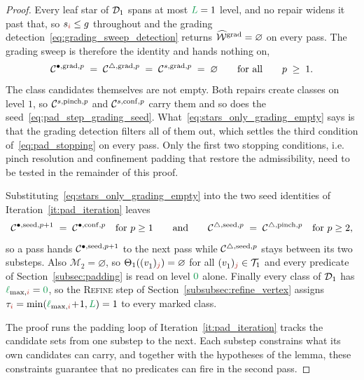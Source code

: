 \documentclass[a4paper, 12pt]{article}
\makeatletter
\DeclareRobustCommand{\candV}[1][]{\mathcal{C}^{\bullet\ifx\@empty#1\@empty\else,#1\fi}}
\DeclareRobustCommand{\candF}[1][]{\mathcal{C}^{\triangle\ifx\@empty#1\@empty\else,#1\fi}}
\DeclareRobustCommand{\candC}[1][]{\mathcal{C}^{s\ifx\@empty#1\@empty\else,#1\fi}}
\newcommand{\lmaxIdx}[1]{\l_{\max,#1}}
\newcommand{\levelSpan}[1]{s_{#1}}
\newcommand{\targetlevel}{\tau}                                 %
\newcommand{\green}{\color{ForestGreen}}
\newcommand{\brickred}{\color{BrickRed}}
\newcommand{\T}{\mathcal{T}}
\newcommand{\vertex}[2]{\freeQ{v}{}{#1}{#2}}
\DeclareRobustCommand{\markedVertexClasses}[1][]{\widehat{\mathcal{W}}\ifx\@empty#1\@empty\else^{#1}\fi}
\newcommand{\coarseIdxone}{{\brickred i}}
\newcommand{\fineIdxone}{{\brickred j}}
\renewcommand{\l}{{\green\ell}}
\renewcommand{\L}{{\green L}}
\newcommand{\lzero}{{\green 0}}
\newcommand{\freeQ}[4]{ ( {#1}^{#2}_{#3} )_{#4}}
\newcommand{\M}{\mathcal{M}}
\theoremstyle{definition}
\theoremstyle{plain}
\numberwithin{equation}{section}
\DeclareRobustCommand{\domseq}[1][]{\mathcal{D}\ifx\@empty#1\@empty\else_{#1}\fi}
\newcommand{\refFan}[1]{\Theta_{#1}}                        %
\makeatother
\begin{document}
\begin{proof}
    Every leaf star of $\domseq[1]$ spans at most $\L = 1$ level, and no repair widens it past that, so $\levelSpan{\coarseIdxone} \leq g$ throughout and the grading detection~\eqref{eq:grading_sweep_detection} returns $\markedVertexClasses[\mathrm{grad}] = \varnothing$ on every pass. The grading sweep is therefore the identity and hands nothing on,
    \begin{equation}
        \label{eq:stars_only_grading_empty}
        \candV[\mathrm{grad},p] \; = \; \candF[\mathrm{grad},p] \; = \; \candC[\mathrm{grad},p] \; = \; \varnothing
        \qquad \text{for all} \qquad p \; \geq \; 1 .
    \end{equation}
    The class candidates themselves are not empty. Both repairs create classes on level $1$, so $\candC[\mathrm{pinch},p]$ and $\candC[\mathrm{conf},p]$ carry them and so does the seed~\eqref{eq:pad_step_grading_seed}. What~\eqref{eq:stars_only_grading_empty} says is that the grading detection filters all of them out, which settles the third condition of~\eqref{eq:pad_stopping} on every pass. Only the first two stopping conditions, i.e. pinch resolution and confinement padding that restore the admissibility, need to be tested in the remainder of this proof. 
    
    Substituting~\eqref{eq:stars_only_grading_empty} into the two seed identities of Iteration~\ref{it:pad_iteration} leaves
    \begin{equation}
        \label{eq:stars_only_seed_identities}
        \candV[\mathrm{seed},p+1] \; = \; \candV[\mathrm{conf},p] \quad \text{for } p \geq 1
        \qquad \text{and} \qquad
        \candF[\mathrm{seed},p] \; = \; \candF[\mathrm{pinch},p] \quad \text{for } p \geq 2 ,
    \end{equation}
    so a pass hands $\candV[\mathrm{seed},p+1]$ to the next pass while $\candF[\mathrm{seed},p]$ stays between its two substeps. Also $\M_2 = \varnothing$, so $\refFan{1}(\vertex{1}{\fineIdxone}) = \varnothing$ for all $\vertex{1}{\fineIdxone} \in \T_1$ and every predicate of Section~\ref{subsec:padding} is read on level $\lzero$ alone. Finally every class of $\domseq[1]$ has $\lmaxIdx{\coarseIdxone} = \lzero$, so the \textsc{Refine} step of Section~\ref{subsubsec:refine_vertex} assigns $\targetlevel_\coarseIdxone = \min(\lmaxIdx{\coarseIdxone} \! + \! 1, \L) = 1$ to every marked class.

    The proof runs the padding loop of Iteration~\ref{it:pad_iteration} tracks the candidate sets from one substep to the next. Each substep constrains what its own candidates can carry, and together with the hypotheses of the lemma, these constraints guarantee that no predicates can fire in the second pass.


\end{proof}
\end{document}
